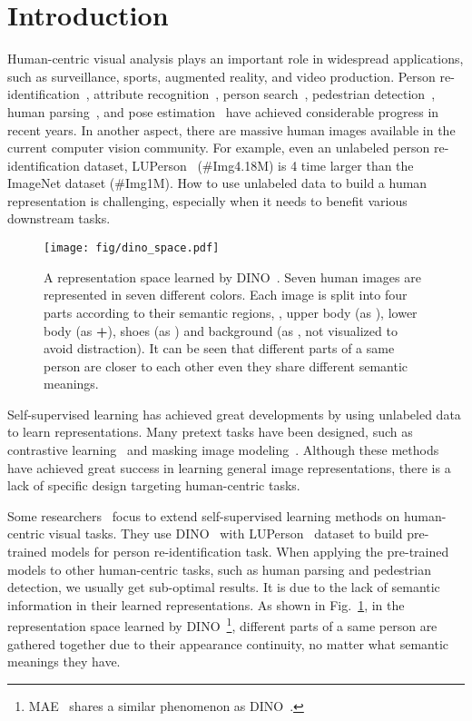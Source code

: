 \documentclass[10pt,twocolumn,letterpaper]{article}
\begin{document}
\section{Introduction}
\label{sec:intro}
\vspace{-0.1cm}
Human-centric visual analysis plays an important role in widespread applications, such as surveillance, sports, augmented reality, and video production. Person re-identification~\cite{reidsurvey1,reidsurvey2,chen2017beyond,chen2017aaai}, attribute recognition~\cite{attrsurvey1,attrsurvey2}, person search~\cite{cuhk-sysu,prw}, pedestrian detection~\cite{detsurvey1,detsurvey2,pedestron}, human parsing~\cite{parsesurvey1,lip}, and pose estimation~\cite{posesurvey1,posesurvey2}  have achieved considerable progress in recent years. 
In another aspect, there are massive human images available in the current computer vision community. For example, even an unlabeled person re-identification dataset, LUPerson~\cite{lup,fu2022large} (\#Img4.18M) is 4 time larger than the ImageNet dataset (\#Img1M).  
How to use unlabeled data to build a human representation is challenging, especially when it needs to benefit various downstream tasks.

\begin{figure}[!t]
\centering
\texttt{[image: fig/dino\_space.pdf]}
\vspace{-0.4cm}
\caption{A representation space learned by DINO~\cite{dino}. Seven human images are represented in seven different colors. Each image is split into four parts according to their semantic regions, \ie, upper body (as ), lower body (as \textbf{+}), shoes (as ) and background (as \textbf{}, not visualized to avoid distraction). It can be seen that different parts of a same person are closer to each other even they share different semantic meanings.}
\label{fig:dino_space}
\vspace{-0.1cm}
\end{figure}

Self-supervised learning has achieved great developments by using unlabeled data to learn representations. Many pretext tasks have been designed, such as contrastive learning~\cite{dino, moco, simclr} and masking image modeling~\cite{ mae, simmim, ibot, beit}. Although these methods have achieved great success in learning general image representations, there is a lack of specific design targeting human-centric tasks.

Some researchers~\cite{luo2021self,pass,yang2022unleashing} focus to extend self-supervised learning methods on human-centric visual tasks. 
They use DINO~\cite{dino} with LUPerson~\cite{lup,fu2022large} dataset to build pre-trained models for person re-identification task. 
When applying the pre-trained models to other human-centric tasks, such as human parsing and pedestrian detection, we usually get sub-optimal results. It is due to the lack of semantic information in their learned representations.  
As shown in Fig.~\ref{fig:dino_space}, in the representation space learned by DINO~\cite{dino}\footnote{MAE~\cite{mae} shares a similar phenomenon as DINO~\cite{dino}.}, 
different parts of a same person are gathered together due to their appearance continuity, no matter what semantic meanings they have.
\end{document}
